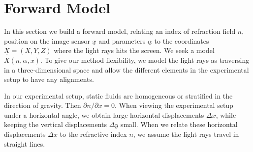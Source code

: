 \documentclass{svjour3}                     %
\begin{document}


 
\section{Forward Model}
\label{sec:formod}
In this section we build a forward model, relating an index of refraction field $n$, position on the image sensor $\underline{x}$ and parameters $\underline{\alpha}$ to the coordinates $\underline{X} = (X,Y,Z)$ where the light rays hits the screen. We seek a model $\underline{X}(n, \underline{\alpha}, \underline{x})$. 
To give our method flexibility, we model the light rays as traversing in a three-dimensional space and allow the different elements in the experimental setup to have any alignments.

In our experimental setup, static fluids are homogeneous or stratified in the direction of gravity. Then $\partial n / \partial x = 0$. When viewing the experimental setup under a horizontal angle, we obtain large horizontal displacements $\Delta x$, while keeping the vertical displacements $\Delta y$ small. When we relate these horizontal displacements $\Delta x$ to the refractive index $n$, we assume the light rays travel in straight lines. 
\end{document}

